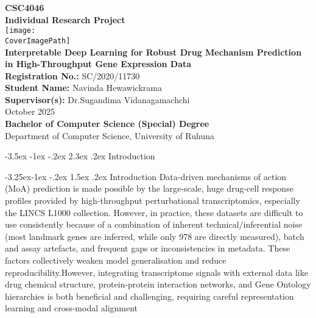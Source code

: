 \documentclass[12pt,a4paper]{article}
\makeatletter
\renewcommand\section{\@startsection{section}{1}{\z@}%
  {-3.5ex \@plus-1ex \@minus-.2ex}%
  {2.3ex \@plus.2ex}%
  {\normalfont\large\bfseries}}
\renewcommand\subsection{\@startsection{subsection}{2}{\z@}%
  {-3.25ex\@plus-1ex \@minus-.2ex}%
  {1.5ex \@plus.2ex}%
  {\normalfont\normalsize\bfseries}}
\newcommand{\CourseCodeNumber}{CSC4046 }
\newcommand{\CourseCodeName}{Individual Research Project}
\newcommand{\ProjectTitle}{Interpretable Deep Learning for Robust Drug Mechanism Prediction in High-Throughput Gene Expression Data}
\newcommand{\StudentName}{Navinda Hewawickrama}
\newcommand{\RegistrationNumber}{SC/2020/11730} %
\newcommand{\Supervisors}{Dr.Sugandima Vidanagamachchi} %
\newcommand{\SubmissionDate}{October 2025}
\newcommand{\CoverImagePath}{RUHUNAPNG} %
\makeatother
\begin{document}
\begin{titlepage}
  \thispagestyle{empty} 
  \begin{center}
    \vspace*{10mm}
    {\Large \textbf{\CourseCodeNumber}}\\[6mm]
    {\Large \textbf{\CourseCodeName}}\\[6mm]
    \texttt{[image: \\CoverImagePath]}\\[10mm]
    
    {\Large \textbf{\ProjectTitle}}\\[10mm]

    

    \textbf{Registration No.:} \RegistrationNumber\\[2mm]
    \textbf{Student Name:} \StudentName\\[6mm]
    \textbf{Supervisor(s):} \Supervisors\\[10mm]

    \SubmissionDate\\[12mm]

    \vfill
    \textbf{Bachelor of Computer Science (Special) Degree}\\
    Department of Computer Science, University of Ruhuna
  \end{center}
\end{titlepage}

\clearpage
{}


\section{Introduction}

\subsection{Introduction}
Data-driven mechanisms of action (MoA) prediction is made possible by the large-scale, huge drug-cell response profiles provided by high-throughput perturbational transcriptomics, especially the LINCS L1000 collection. However, in practice, these datasets are difficult to use consistently because of a combination of inherent technical/inferential noise (most landmark genes are inferred, while only 978 are directly measured), batch and assay artefacts, and frequent gaps or inconsistencies in metadata. These factors collectively weaken model generalisation and reduce reproducibility.However, integrating transcriptome signals with external data like drug chemical structure, protein-protein interaction networks, and Gene Ontology hierarchies is both beneficial and challenging, requiring careful representation learning and cross-modal alignment\cite{subramanian2017next,stathias2018sustainable,mcdermott2019deep,wu2022deep}
\end{document}
